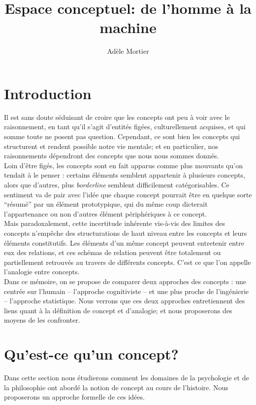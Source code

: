\documentclass[french]{article}
\author{Adèle Mortier}
\title{Espace conceptuel: de l'homme à la machine}
\begin{document}
	\maketitle
	\nocite{*}
	\tableofcontents
	\newpage
	\section*{Introduction}
		Il est sans doute séduisant de croire que les concepts ont peu à voir avec le raisonnement, en tant qu'il s'agit d'entités figées, culturellement acquises, et qui somme toute ne posent pas question. Cependant, ce sont bien les concepts qui structurent et rendent possible notre vie mentale; et en particulier, nos raisonnements dépendront des concepts que nous nous sommes donnés.\\
		Loin d'être figés, les concepts sont en fait apparus comme plus mouvants qu'on tendait à le penser : certains éléments semblent appartenir à plusieurs concepts, alors que d'autres, plus \textit{borderline} semblent difficilement catégorisables. Ce sentiment va de pair avec l'idée que chaque concept pourrait être en quelque sorte ``résumé'' par un élément prototypique, qui du même coup dicterait l'appartenance ou non d'autres élément périphériques à ce concept.\\
		Mais paradoxalement, cette incertitude inhérente vis-à-vis des limites des concepts n'empêche des structurations de haut niveau entre les concepts et leurs éléments constitutifs. Les éléments d'un même concept peuvent entretenir entre eux des relations, et ces schémas de relation peuvent être totalement ou partiellement retrouvés au travers de différents concepts. C'est ce que l'on appelle l'analogie entre concepts.\\
		Dans ce mémoire, on se propose de comparer deux approches des concepts : une centrée sur l'humain -- l'approche cognitiviste -- et une plus proche de l'ingénierie -- l'approche statistique. Nous verrons que ces deux approches entretiennent des liens quant à la définition de concept et d'analogie; et nous proposerons des moyens de les confronter.
	\section{Qu'est-ce qu'un concept?}
		Dans cette section nous étudierons comment les domaines de la psychologie et de la philosophie ont abordé la notion de concept au cours de l'histoire. Nous proposerons un approche formelle de ces idées.
\end{document}
